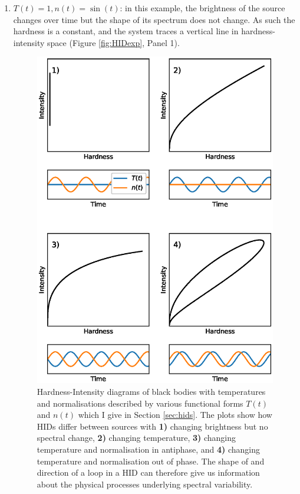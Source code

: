 \begin{enumerate}
\item $T(t)=1, n(t)=\sin(t)$: in this example, the brightness of the source changes over time but the shape of its spectrum does not change.  As such the hardness is a constant, and the system traces a vertical line in hardness-intensity space (Figure \ref{fig:HIDexp}, Panel 1).
\begin{figure}
    \includegraphics[width=\columnwidth, trim = 0mm 25mm 0mm 25mm]{images/hidexp.eps}
    \captionsetup{singlelinecheck=off}
    \caption[Hardness-Intensity diagrams of black bodies with temperatures and normalisations described by various functional forms.]{Hardness-Intensity diagrams of black bodies with temperatures and normalisations described by various functional forms $T(t)$ and $n(t)$ which I give in Section \ref{sec:hids}.  The plots show how HIDs differ between sources with \textbf{1)} changing brightness but no spectral change, \textbf{2)} changing temperature, \textbf{3)} changing temperature and normalisation in antiphase, and \textbf{4)} changing temperature and normalisation out of phase.  The shape of and direction of a loop in a HID can therefore give us information about the physical processes underlying spectral variability.}

\end{figure}
\end{enumerate}
